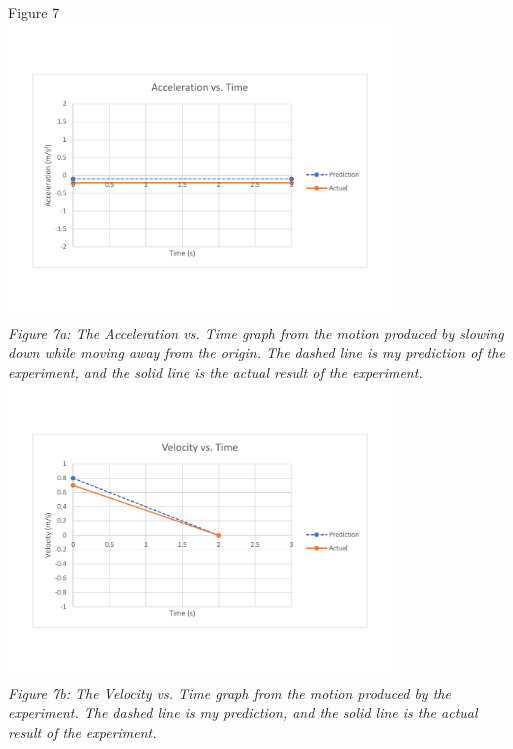 \documentclass[aps,letterpaper,11pt]{revtex4}
\begin{document}
\newpage

\begin{center}
Figure 7\\
\vspace{-10mm}
\includegraphics[width=4in]{PartBSlowingdownAcc.pdf}\\
\vspace{-10mm}
\textit{Figure 7a: The Acceleration vs. Time graph from the motion produced by slowing down while moving away from the origin. The dashed line is my prediction of the experiment, and the solid line is the actual result of the experiment.}\\
\includegraphics[width=4in]{PartBSlowingDownVel.pdf}\\
\vspace{-10mm}
\textit{Figure 7b: The Velocity vs. Time graph from the motion produced by the experiment. The dashed line is my prediction, and the solid line is the actual result of the experiment.}
\end{center}
\end{document}
